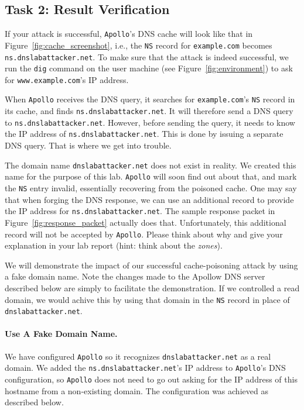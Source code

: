 \subsection{Task 2: Result Verification}


If your attack is successful, {\tt Apollo}'s DNS cache will look like 
that in Figure~\ref{fig:cache_screenshot}, i.e., the {\tt NS} record 
for {\tt example.com} becomes {\tt ns.dnslabattacker.net}. To make sure
that the attack is indeed successful, we run the {\tt dig} command 
on the user machine (see Figure~\ref{fig:environment}) to 
ask for {\tt www.example.com}'s IP address. 

When {\tt Apollo} receives the DNS query, it searches
for {\tt example.com}'s {\tt NS} record in its cache,
and finds {\tt ns.dnslabattacker.net}.
It will therefore send a DNS query to {\tt ns.dnslabattacker.net}.
However, before sending the query, it needs to know the IP address of 
{\tt ns.dnslabattacker.net}. This is done by issuing a separate DNS query. 
That is where we get into trouble.


The domain name {\tt dnslabattacker.net} does not exist in reality.
We created this name for the purpose of this lab. {\tt Apollo} will soon
find out about that, and mark the {\tt NS} entry invalid, essentially recovering 
from the poisoned cache. One may say that when forging the DNS response, we
can use an additional record to provide the IP address for 
{\tt ns.dnslabattacker.net}. The sample response packet in 
Figure~\ref{fig:response_packet} actually does that. Unfortunately,
this additional record will not be accepted by {\tt Apollo}. Please think
about why and give your explanation in your lab report (hint: think
about the {\em zones}).

We will demonstrate the impact
of our successful cache-poisoning attack by using a fake domain name.
Note the changes made to the Apollow DNS server described below are simply
to facilitate the demonstration. If we controlled a read domain, we would achive
this by using that domain in the {\tt NS} record in place of {\tt dnslabattacker.net}.

\paragraph{Use A Fake Domain Name.}
We have configured {\tt Apollo} so
it recognizes {\tt dnslabattacker.net} as a real domain. We added
the {\tt ns.dnslabattacker.net}'s IP address to {\tt Apollo}'s DNS configuration,
so {\tt Apollo} does not need to go out asking for the IP address of this
hostname from a non-existing domain. The configuration was achieved as described
below.

